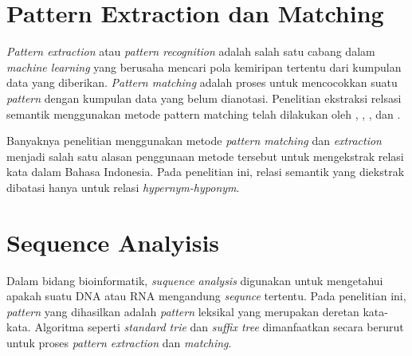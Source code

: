 \section{Pattern Extraction dan Matching}
\textit{Pattern extraction} atau \textit{pattern recognition} adalah salah satu cabang dalam \textit{machine learning} yang berusaha mencari pola kemiripan tertentu dari kumpulan data yang diberikan. \textit{Pattern matching} adalah proses untuk mencocokkan suatu \textit{pattern} dengan kumpulan data yang belum dianotasi. Penelitian ekstraksi relsasi semantik menggunakan metode pattern matching telah dilakukan oleh \cite{hearst1992automatic}, \cite{ruiz2005automatic}, \cite{arnold2014extracting}, dan \cite{sumida2008hacking}.

Banyaknya penelitian menggunakan metode \textit{pattern matching} dan \textit{extraction} menjadi salah satu alasan penggunaan metode tersebut untuk mengekstrak relasi kata dalam Bahasa Indonesia. Pada penelitian ini, relasi semantik yang diekstrak dibatasi hanya untuk relasi \textit{hypernym-hyponym}. 


\section{Sequence Analyisis}
Dalam bidang bioinformatik, \textit{suquence analysis} digunakan untuk mengetahui apakah suatu DNA atau RNA mengandung \textit{sequnce} tertentu. Pada penelitian ini, \textit{pattern} yang dihasilkan adalah \textit{pattern} leksikal yang merupakan deretan kata-kata. Algoritma seperti \textit{standard trie} dan \textit{suffix tree} dimanfaatkan secara berurut untuk proses \textit{pattern extraction} dan \textit{matching}.

